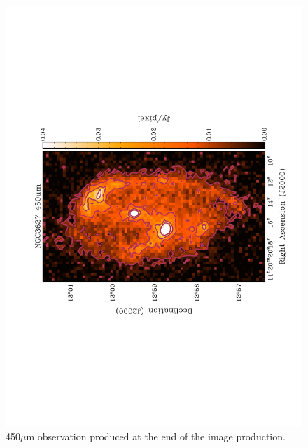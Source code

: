 \begin{figure}
  \centering
  \label{fig_450}
  \includegraphics[scale=0.5,angle=270]{obs_imgs/450_um.jpeg}
  \caption[NGC3627 450$\mu$m Observations]{450$\mu$m observation produced at the end of the image production.}
\end{figure}

